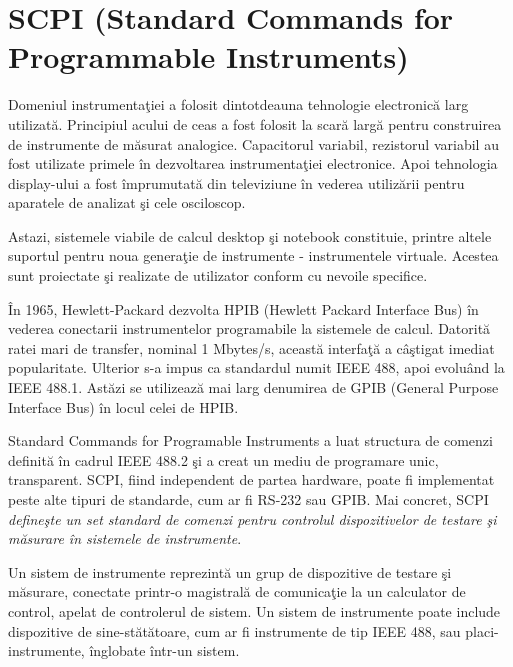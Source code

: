 
\chapter{SCPI (Standard Commands for Programmable Instruments)
} %
\label{Capitolul2}

Domeniul instrumenta\c{t}iei a folosit dintotdeauna tehnologie electronic\u{a} larg utilizat\u{a}. Principiul acului de ceas a fost folosit la scar\u{a} larg\u{a} pentru construirea de instrumente de m\u{a}surat analogice. Capacitorul variabil, rezistorul variabil au fost utilizate primele \^{i}n dezvoltarea instrumenta\c{t}iei electronice. Apoi tehnologia display-ului a fost \^{i}mprumutat\u{a} din televiziune \^{i}n vederea utiliz\u{a}rii pentru aparatele de analizat \c{s}i cele osciloscop.

Astazi, sistemele viabile de calcul desktop \c{s}i notebook constituie, printre altele suportul pentru noua genera\c{t}ie de instrumente - instrumentele virtuale. Acestea sunt proiectate \c{s}i realizate de utilizator conform cu nevoile specifice.

\^{I}n 1965, Hewlett-Packard dezvolta HPIB (Hewlett Packard Interface Bus) \^{i}n vederea conectarii instrumentelor programabile la sistemele de calcul. Datorit\u{a} ratei mari de transfer, nominal 1 Mbytes/s, aceast\u{a} interfa\c{t}\u{a} a c\^{a}\c{s}tigat imediat popularitate. Ulterior s-a impus ca standardul numit IEEE 488, apoi evolu\^{a}nd la IEEE 488.1. Ast\u{a}zi se utilizeaz\u{a} mai larg denumirea de GPIB (General Purpose Interface Bus) \^{i}n locul celei de HPIB. 

Standard Commands for Programable Instruments a luat structura de comenzi definit\u{a} \^{i}n cadrul IEEE 488.2 \c{s}i a creat un mediu de programare unic, transparent. SCPI, fiind independent de partea hardware, poate fi implementat peste alte tipuri de standarde, cum ar fi RS-232 sau GPIB. Mai concret, SCPI \emph{define\c{s}te un set standard de comenzi pentru controlul dispozitivelor de testare \c{s}i m\u{a}surare \^{i}n sistemele de instrumente}.

Un sistem de instrumente reprezint\u{a} un grup de dispozitive de testare \c{s}i m\u{a}surare, conectate printr-o magistral\u{a} de comunica\c{t}ie la un calculator de control, apelat de controlerul de sistem. Un sistem de instrumente poate include dispozitive de sine-st\u{a}t\u{a}toare, cum ar fi instrumente de tip IEEE 488, sau placi-instrumente, \^{i}nglobate \^{i}ntr-un sistem.


